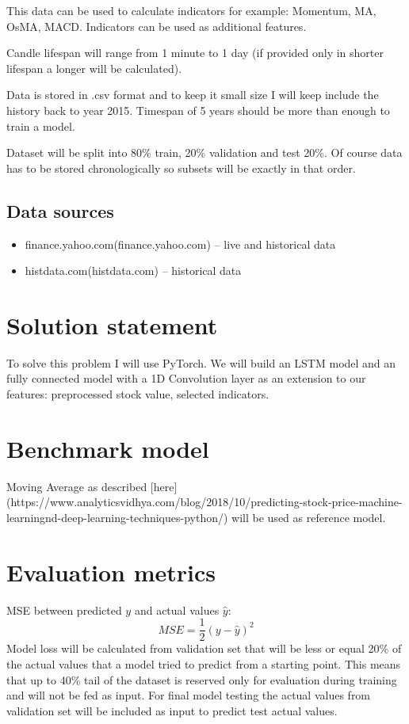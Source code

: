 \documentclass[a4paper,12pt]{article}
\begin{document}
This data can be used to calculate indicators for example: Momentum, MA, OsMA, MACD. Indicators can be used as additional features.

Candle lifespan will range from 1 minute to 1 day (if provided only in shorter lifespan a longer will be calculated).

Data is stored in .csv format and to keep it small size I will keep include the history back to year 2015. Timespan of 5 years should be more than enough to train a model.

Dataset will be split into 80\% train, 20\% validation and test 20\%.
Of course data has to be stored chronologically so subsets will be exactly in that order.

\subsection*{Data sources}

\begin{itemize}
	\item finance.yahoo.com(finance.yahoo.com) -- live and historical data
	\item histdata.com(histdata.com) -- historical data
\end{itemize}

\section{Solution statement}
To solve this problem I will use PyTorch.
We will build an LSTM model and an fully connected model with a 1D Convolution layer as an extension to our features: preprocessed stock value, selected indicators.

\section{Benchmark model}
Moving Average as described [here](https://www.analyticsvidhya.com/blog/2018/10/predicting-stock-price-machine-learningnd-deep-learning-techniques-python/) will be used as reference model.

\section{Evaluation metrics}
MSE between predicted $y$ and actual values $\hat{y}$:
\begin{equation}
	MSE = \frac{1}{2} \left( y - \hat{y} \right)^2
\end{equation}
Model loss will be calculated from validation set that will be less or equal 20\% of the actual values that a model tried to predict from a starting point. This means that up to 40\% tail of the dataset is reserved only for evaluation during training and will not be fed as input. For final model testing the actual values from validation set will be included as input to predict test actual values.
\end{document}
